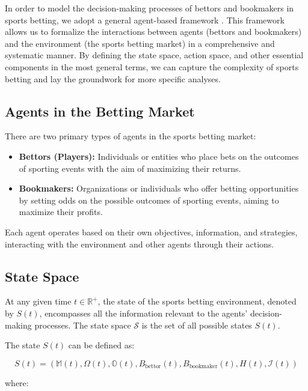 In order to model the decision-making processes of bettors and bookmakers in sports betting, we adopt a general agent-based framework \cite{Ferguson1967}. This framework allows us to formalize the interactions between agents (bettors and bookmakers) and the environment (the sports betting market) in a comprehensive and systematic manner. By defining the state space, action space, and other essential components in the most general terms, we can capture the complexity of sports betting and lay the groundwork for more specific analyses.

\subsection{Agents in the Betting Market}

There are two primary types of agents in the sports betting market:

\begin{itemize}
    \item \textbf{Bettors (Players):} Individuals or entities who place bets on the outcomes of sporting events with the aim of maximizing their returns.
    \item \textbf{Bookmakers:} Organizations or individuals who offer betting opportunities by setting odds on the possible outcomes of sporting events, aiming to maximize their profits.
\end{itemize}

Each agent operates based on their own objectives, information, and strategies, interacting with the environment and other agents through their actions.

\subsection{State Space}

At any given time \( t \in \mathbb{R}^+ \), the state of the sports betting environment, denoted by \( S(t) \), encompasses all the information relevant to the agents' decision-making processes. The state space \( \mathcal{S} \) is the set of all possible states \( S(t) \).

The state \( S(t) \) can be defined as:

\[
S(t) = \left( \mathbb{M}(t), \Omega(t), \mathbb{O}(t), B_{\text{bettor}}(t), B_{\text{bookmaker}}(t), H(t), \mathcal{I}(t) \right)
\]

where:


